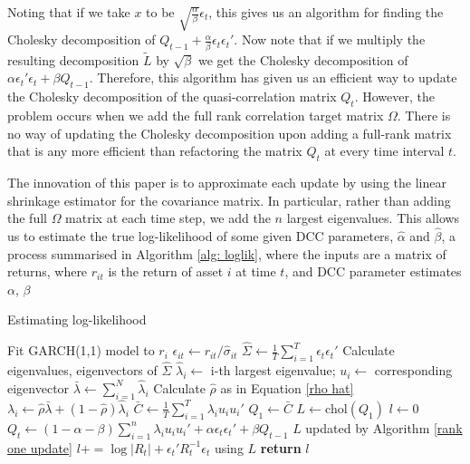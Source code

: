 \documentclass{article} %
\numberwithin{equation}{section} %
\numberwithin{figure}{section} %
\numberwithin{table}{section} %
\begin{document}
Noting that if we take $x$ to be $\sqrt{\frac{\alpha}{\beta}}\epsilon_t$, this gives us an algorithm for finding the Cholesky decomposition of $Q_{t-1} + \frac{\alpha }{\beta}\epsilon_t \epsilon_t'$. Now note that if we multiply the resulting decomposition $\tilde{L}$ by $\sqrt{\beta}$ we get the Cholesky decomposition of $\alpha \epsilon_t' \epsilon_t + \beta Q_{t-1}$. Therefore, this algorithm has given us an efficient way to update the Cholesky decomposition of the quasi-correlation matrix $Q_t$. However, the problem occurs when we add the full rank correlation target matrix $\Omega$. There is no way of updating the Cholesky decomposition upon adding a full-rank matrix that is any more efficient than refactoring the matrix $Q_t$ at every time interval $t$.

The innovation of this paper is to approximate each update by using the linear shrinkage estimator for the covariance matrix. In particular, rather than adding the full $\Omega$ matrix at each time step, we add the $n$ largest eigenvalues. This allows us to estimate the true log-likelihood of some given DCC parameters, $\hat{\alpha}$ and  $\hat{\beta}$, a process summarised in Algorithm \ref{alg: loglik}, where the inputs are a matrix of returns, where $r_{it}$ is the return of asset $i$ at time $t$, and DCC parameter estimates $\alpha$, $\beta$

\begin{algorithm}[h]
\caption{Estimating log-likelihood}\label{alg: loglik}
\begin{algorithmic}[1]
\State Fit GARCH(1,1) model to $r_i$
\State $\epsilon_{it} \gets r_{it} / \hat{\sigma}_{it}$
\EndFor
\State $\hat{\Sigma} \gets \frac{1}{T}\sum\limits_{i=1}^T \epsilon_t \epsilon_t'$
\State Calculate eigenvalues, eigenvectors of $\hat{\Sigma}$
\State $\hat{\lambda}_i \gets$ i-th largest eigenvalue; $u_i \gets$ corresponding eigenvector
\State $\bar{\lambda} \gets \sum\limits_{i = 1}^N \hat{\lambda}_i$
\State Calculate $\hat{\rho}$ as in Equation \ref{rho hat}
\State $\lambda_i \gets \hat{\rho}\bar{\lambda} + (1 - \hat{\rho})\hat{\lambda}_i$
\EndFor
\State $\bar{C} \gets \frac{1}{T} \sum\limits_{i = 1}^{T} \lambda_i u_i u_i'$
\State $Q_1 \gets \bar{C}$
\State $L \gets \text{chol}(Q_1)$
\State $l \gets 0$
\State $Q_{t} \gets (1 - \alpha - \beta) \sum\limits_{i = 1}^n \lambda_i u_i u_i' + \alpha \epsilon_t \epsilon_t' + \beta Q_{t-1}$
\State $L$ updated by Algorithm \ref{rank one update}
\State $l += \log{|R_t|} + \epsilon_t'R_t^{-1}\epsilon_t$ using $L$
\EndFor
\State \textbf{return} $l$
\EndProcedure
\end{algorithmic}
\end{algorithm}
\end{document}
